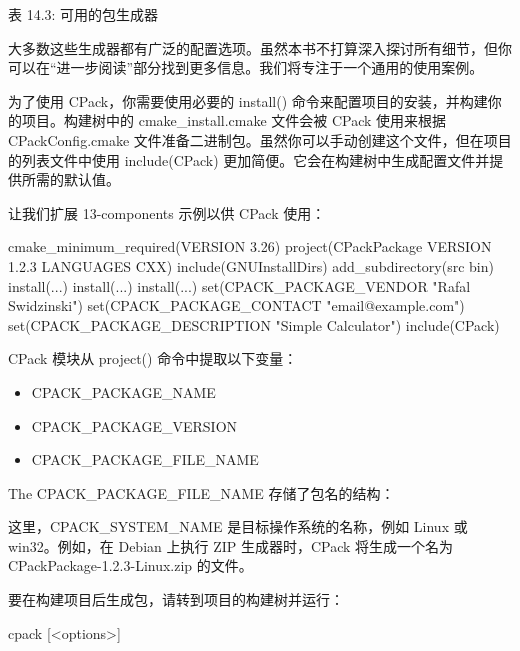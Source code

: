 \begin{center}
表 14.3: 可用的包生成器
\end{center}

大多数这些生成器都有广泛的配置选项。虽然本书不打算深入探讨所有细节，但你可以在“进一步阅读”部分找到更多信息。我们将专注于一个通用的使用案例。

为了使用 CPack，你需要使用必要的 install() 命令来配置项目的安装，并构建你的项目。构建树中的 cmake\_install.cmake 文件会被 CPack 使用来根据 CPackConfig.cmake 文件准备二进制包。虽然你可以手动创建这个文件，但在项目的列表文件中使用 include(CPack) 更加简便。它会在构建树中生成配置文件并提供所需的默认值。

让我们扩展 13-components 示例以供 CPack 使用：


\begin{cmake}
cmake_minimum_required(VERSION 3.26)
project(CPackPackage VERSION 1.2.3 LANGUAGES CXX)
include(GNUInstallDirs)
add_subdirectory(src bin)
install(...)
install(...)
install(...)
set(CPACK_PACKAGE_VENDOR "Rafal Swidzinski")
set(CPACK_PACKAGE_CONTACT "email@example.com")
set(CPACK_PACKAGE_DESCRIPTION "Simple Calculator")
include(CPack)
\end{cmake}

CPack 模块从 project() 命令中提取以下变量：

\begin{itemize}
\item
CPACK\_PACKAGE\_NAME

\item
CPACK\_PACKAGE\_VERSION

\item
CPACK\_PACKAGE\_FILE\_NAME
\end{itemize}

The CPACK\_PACKAGE\_FILE\_NAME 存储了包名的结构：


这里，CPACK\_SYSTEM\_NAME 是目标操作系统的名称，例如 Linux 或 win32。例如，在 Debian 上执行 ZIP 生成器时，CPack 将生成一个名为 CPackPackage-1.2.3-Linux.zip 的文件。

要在构建项目后生成包，请转到项目的构建树并运行：

\begin{shell}
cpack [<options>]
\end{shell}

